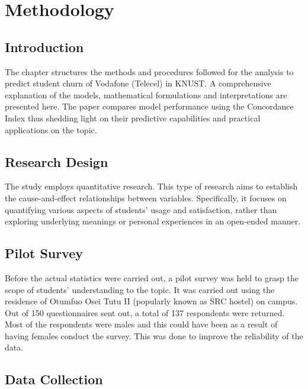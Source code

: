 \documentclass[12pt]{report}
\begin{document}
\section{}


\newpage
\chapter{Methodology}

\section{Introduction}

The chapter structures the methods and procedures followed for the analysis to predict student churn of Vodafone (Telecel) in KNUST. A comprehensive explanation of the models, mathematical formulations and interpretations are presented here. The paper compares model performance using the Concordance Index thus shedding light on their predictive capabilities and practical applications on the topic.

\section{Research Design}

The study employs quantitative research. This type of research aims to establish the cause-and-effect relationships between variables. Specifically, it focuses on quantifying various aspects of students’ usage and satisfaction, rather than exploring underlying meanings or personal experiences in an open-ended manner.

\section{Pilot Survey}

Before the actual statistics were carried out, a pilot survey was held to grasp the scope of students’ understanding to the topic. It was carried out using the residence of Otumfuo Osei Tutu II (popularly known as SRC hostel) on campus. Out of 150 questionnaires sent out, a total of 137 respondents were returned. Most of the respondents were males and this could have been as a result of having females conduct the survey. This was done to improve the reliability of the data.

\section{Data Collection}
\end{document}
